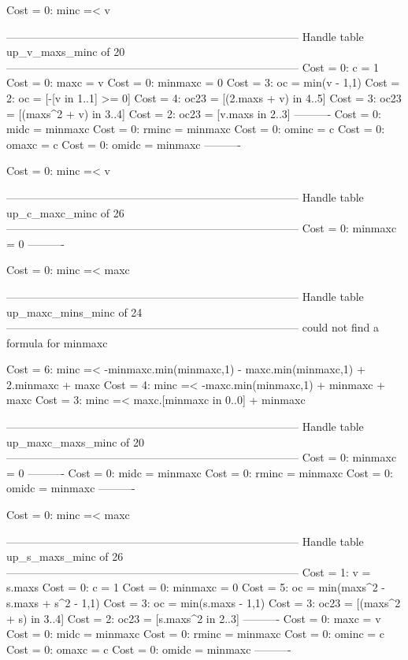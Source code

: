 Cost =  0:  minc =< v

--------------------------------------------------------------------------------
Handle table up_v_maxs_minc of 20
--------------------------------------------------------------------------------
Cost =  0:  c       = 1
Cost =  0:  maxc    = v
Cost =  0:  minmaxc = 0
Cost =  3:  oc      = min(v - 1,1)
Cost =  2:  oc      = [-[v in 1..1] >= 0]
Cost =  4:  oc23    = [(2.maxs + v) in 4..5]
Cost =  3:  oc23    = [(maxs^2 + v) in 3..4]
Cost =  2:  oc23    = [v.maxs in 2..3]
----------
Cost =  0:  midc    = minmaxc
Cost =  0:  rminc   = minmaxc
Cost =  0:  ominc   = c
Cost =  0:  omaxc   = c
Cost =  0:  omidc   = minmaxc
----------

Cost =  0:  minc =< v

--------------------------------------------------------------------------------
Handle table up_c_maxc_minc of 26
--------------------------------------------------------------------------------
Cost =  0:  minmaxc = 0
----------

Cost =  0:  minc =< maxc

--------------------------------------------------------------------------------
Handle table up_maxc_mins_minc of 24
--------------------------------------------------------------------------------
could not find a formula for minmaxc

Cost =  6:  minc =< -minmaxc.min(minmaxc,1) - maxc.min(minmaxc,1) + 2.minmaxc + maxc
Cost =  4:  minc =< -maxc.min(minmaxc,1) + minmaxc + maxc
Cost =  3:  minc =< maxc.[minmaxc in 0..0] + minmaxc

--------------------------------------------------------------------------------
Handle table up_maxc_maxs_minc of 20
--------------------------------------------------------------------------------
Cost =  0:  minmaxc = 0
----------
Cost =  0:  midc    = minmaxc
Cost =  0:  rminc   = minmaxc
Cost =  0:  omidc   = minmaxc
----------

Cost =  0:  minc =< maxc

--------------------------------------------------------------------------------
Handle table up_s_maxs_minc of 26
--------------------------------------------------------------------------------
Cost =  1:  v       = s.maxs
Cost =  0:  c       = 1
Cost =  0:  minmaxc = 0
Cost =  5:  oc      = min(maxs^2 - s.maxs + s^2 - 1,1)
Cost =  3:  oc      = min(s.maxs - 1,1)
Cost =  3:  oc23    = [(maxs^2 + s) in 3..4]
Cost =  2:  oc23    = [s.maxs^2 in 2..3]
----------
Cost =  0:  maxc    = v
Cost =  0:  midc    = minmaxc
Cost =  0:  rminc   = minmaxc
Cost =  0:  ominc   = c
Cost =  0:  omaxc   = c
Cost =  0:  omidc   = minmaxc
----------

